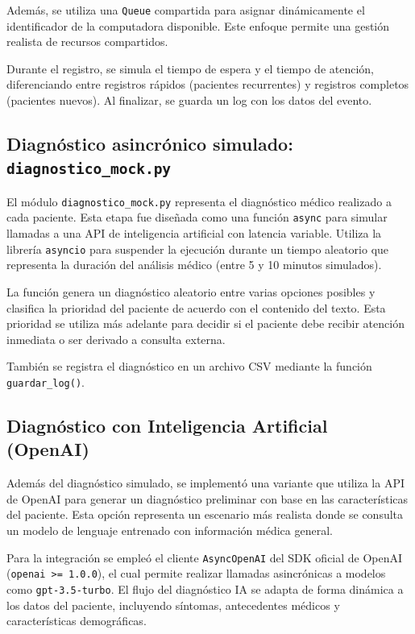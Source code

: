 \documentclass{article}
\begin{document}
Además, se utiliza una \texttt{Queue} compartida para asignar dinámicamente el identificador de la computadora disponible. Este enfoque permite una gestión realista de recursos compartidos.

Durante el registro, se simula el tiempo de espera y el tiempo de atención, diferenciando entre registros rápidos (pacientes recurrentes) y registros completos (pacientes nuevos). Al finalizar, se guarda un log con los datos del evento.

\subsection{Diagnóstico asincrónico simulado: \texttt{diagnostico\_mock.py}}

El módulo \texttt{diagnostico\_mock.py} representa el diagnóstico médico realizado a cada paciente. Esta etapa fue diseñada como una función \texttt{async} para simular llamadas a una API de inteligencia artificial con latencia variable. Utiliza la librería \texttt{asyncio} para suspender la ejecución durante un tiempo aleatorio que representa la duración del análisis médico (entre 5 y 10 minutos simulados).

La función genera un diagnóstico aleatorio entre varias opciones posibles y clasifica la prioridad del paciente de acuerdo con el contenido del texto. Esta prioridad se utiliza más adelante para decidir si el paciente debe recibir atención inmediata o ser derivado a consulta externa.

También se registra el diagnóstico en un archivo CSV mediante la función \texttt{guardar\_log()}.

\subsection{Diagnóstico con Inteligencia Artificial (OpenAI)}

Además del diagnóstico simulado, se implementó una variante que utiliza la API de OpenAI para generar un diagnóstico preliminar con base en las características del paciente. Esta opción representa un escenario más realista donde se consulta un modelo de lenguaje entrenado con información médica general.

Para la integración se empleó el cliente \texttt{AsyncOpenAI} del SDK oficial de OpenAI (\texttt{openai >= 1.0.0}), el cual permite realizar llamadas asincrónicas a modelos como \texttt{gpt-3.5-turbo}. El flujo del diagnóstico IA se adapta de forma dinámica a los datos del paciente, incluyendo síntomas, antecedentes médicos y características demográficas.
\end{document}
